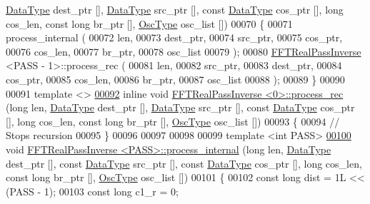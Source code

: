 \begin{DoxyCode}
      \hyperlink{a00014_adecc3668f71245ef20a93546a55b3190}{DataType} dest\_ptr [], \hyperlink{a00014_adecc3668f71245ef20a93546a55b3190}{DataType} src\_ptr [], \textcolor{keyword}{const} \hyperlink{a00014_adecc3668f71245ef20a93546a55b3190}{DataType} cos\_ptr [], \textcolor{keywordtype}{long} cos\_len,
       \textcolor{keyword}{const} \textcolor{keywordtype}{long} br\_ptr [], \hyperlink{a00020}{OscType} osc\_list [])
00070 \{
00071     process\_internal (
00072         len,
00073         dest\_ptr,
00074         src\_ptr,
00075         cos\_ptr,
00076         cos\_len,
00077         br\_ptr,
00078         osc\_list
00079     );
00080     \hyperlink{a00014}{FFTRealPassInverse} <PASS - 1>::process\_rec (
00081         len,
00082         src\_ptr,
00083         dest\_ptr,
00084         cos\_ptr,
00085         cos\_len,
00086         br\_ptr,
00087         osc\_list
00088     );
00089 \}
00090 
00091 \textcolor{keyword}{template} <>
\hypertarget{a00103_source_l00092}{}\hyperlink{a00014_ade4930b09c1d670d978f9185a53973f2}{00092} \textcolor{keyword}{inline} \textcolor{keywordtype}{void} \hyperlink{a00014}{FFTRealPassInverse <0>::process\_rec} (\textcolor{keywordtype}{long} len, 
      \hyperlink{a00014_adecc3668f71245ef20a93546a55b3190}{DataType} dest\_ptr [], \hyperlink{a00014_adecc3668f71245ef20a93546a55b3190}{DataType} src\_ptr [], \textcolor{keyword}{const} \hyperlink{a00014_adecc3668f71245ef20a93546a55b3190}{DataType} cos\_ptr [], \textcolor{keywordtype}{long} cos\_len,
       \textcolor{keyword}{const} \textcolor{keywordtype}{long} br\_ptr [], \hyperlink{a00020}{OscType} osc\_list [])
00093 \{
00094     \textcolor{comment}{// Stops recursion}
00095 \}
00096 
00097 
00098 
00099 \textcolor{keyword}{template} <\textcolor{keywordtype}{int} PASS>
\hypertarget{a00103_source_l00100}{}\hyperlink{a00014_a0cb9d4c02a1f1b9e0f9f64dc38adf679}{00100} \textcolor{keywordtype}{void}    \hyperlink{a00014}{FFTRealPassInverse <PASS>::process\_internal} (\textcolor{keywordtype}{long} len, 
      \hyperlink{a00014_adecc3668f71245ef20a93546a55b3190}{DataType} dest\_ptr [], \textcolor{keyword}{const} \hyperlink{a00014_adecc3668f71245ef20a93546a55b3190}{DataType} src\_ptr [], \textcolor{keyword}{const} \hyperlink{a00014_adecc3668f71245ef20a93546a55b3190}{DataType} cos\_ptr [], \textcolor{keywordtype}{long} 
      cos\_len, \textcolor{keyword}{const} \textcolor{keywordtype}{long} br\_ptr [], \hyperlink{a00020}{OscType} osc\_list [])
00101 \{
00102     \textcolor{keyword}{const} \textcolor{keywordtype}{long}      dist = 1L << (PASS - 1);
00103     \textcolor{keyword}{const} \textcolor{keywordtype}{long}      c1\_r = 0;

\end{DoxyCode}

